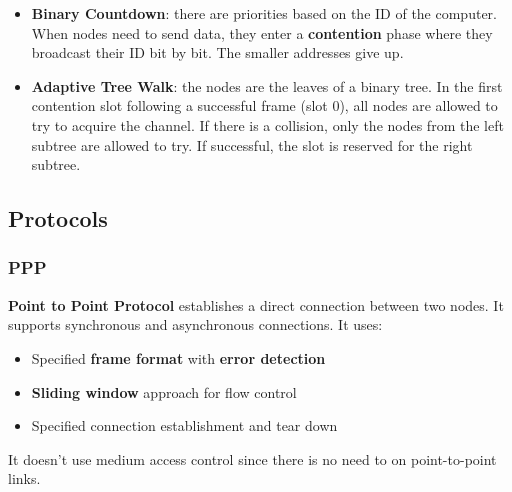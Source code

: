\begin{itemize}
\begin{itemize}
\begin{itemize}
			\item \textbf{Binary Countdown}: there are priorities based on the ID of the computer. When nodes need to send data, they enter a \textbf{contention} phase where they broadcast their ID bit by bit. The smaller addresses give up.
			\item \textbf{Adaptive Tree Walk}: the nodes are the leaves of a binary tree. In the first contention slot following a successful frame (slot $0$), all nodes are allowed to try to acquire the channel. If there is a collision, only the nodes from the left subtree are allowed to try. If successful, the slot is reserved for the right subtree.
		\end{itemize}
	\end{itemize}
\end{itemize}

\subsection{Protocols}
\subsubsection{PPP}
\textbf{Point to Point Protocol} establishes a direct connection between two nodes. It supports synchronous and asynchronous connections. It uses:
\begin{itemize}
	\item Specified \textbf{frame format} with \textbf{error detection}
	\item \textbf{Sliding window} approach for flow control
	\item Specified connection establishment and tear down
\end{itemize}
It doesn't use medium access control since there is no need to on point-to-point links.

